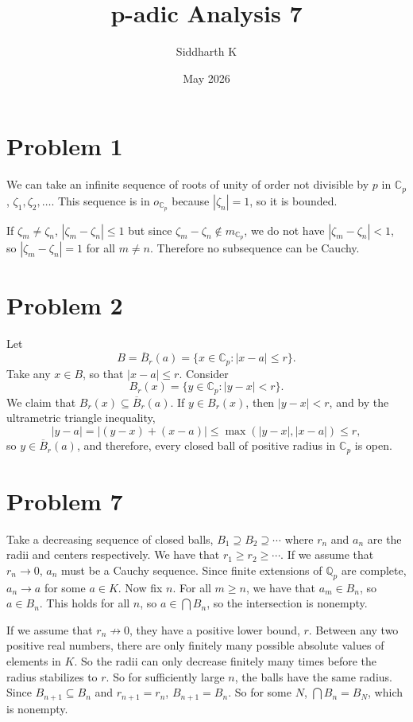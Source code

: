 \documentclass{article}
\title{p-adic Analysis 7}
\author{Siddharth K}
\date{May 2026}
\newcommand{\Q}{\mathbb{Q}}
\newcommand{\C}{\mathbb{C}}
\begin{document}
\maketitle

\section*{Problem 1}
We can take an infinite sequence of roots of unity of order not divisible by $p$ in $\C_p$, $\zeta_1, \zeta_2, \ldots$. This sequence is in $o_{\C_p}$ because $|\zeta_n| = 1$, so it is bounded.

If $\zeta_m \neq \zeta_n$, $|\zeta_m - \zeta_n| \le 1$ but since $\zeta_m - \zeta_n \not\in m_{\C_p}$, we do not have $|\zeta_m - \zeta_n| < 1$, so $|\zeta_m - \zeta_n| = 1$ for all $m \neq n$. Therefore no subsequence can be Cauchy.

\section*{Problem 2}
Let
$$B = \overline{B}_r(a) = \{x \in \C_p: |x - a| \le r\}.$$
Take any $x \in B$, so that $|x - a| \le r$. Consider
$$B_r(x) = \{y \in \C_p: |y - x| < r\}.$$
We claim that $B_r(x) \subseteq \overline{B}_r(a)$. If $y \in B_r(x)$, then $|y - x| < r$, and by the ultrametric triangle inequality,
$$|y - a| = |(y - x) + (x - a)| \le \max(|y - x|, |x - a|) \le r,$$
so $y \in \overline{B}_r(a)$, and therefore, every closed ball of positive radius in $\C_p$ is open.

\section*{Problem 7}
Take a decreasing sequence of closed balls, $B_1 \supseteq B_2 \supseteq \cdots$ where $r_n$ and $a_n$ are the radii and centers respectively. We have that $r_1 \ge r_2 \ge \cdots$. If we assume that $r_n \to 0$, $a_n$ must be a Cauchy sequence. Since finite extensions of $\Q_p$ are complete, $a_n \to a$ for some $a \in K$. Now fix $n$. For all $m \ge n$, we have that $a_m \in B_n$, so $a \in B_n$. This holds for all $n$, so $a \in \bigcap B_n$, so the intersection is nonempty.

If we assume that $r_n \not\to 0$, they have a positive lower bound, $r$. Between any two positive real numbers, there are only finitely many possible absolute values of elements in $K$. So the radii can only decrease finitely many times before the radius stabilizes to $r$. So for sufficiently large $n$, the balls have the same radius. Since $B_{n + 1} \subseteq B_n$ and $r_{n + 1} = r_n$, $B_{n + 1} = B_n$. So for some $N$, $\bigcap B_n = B_N$, which is nonempty.
\end{document}
